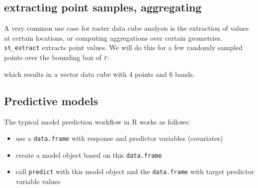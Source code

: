 \documentclass[]{book}
\newenvironment{Shaded}{\begin{snugshade}}{\end{snugshade}}
\newcommand{\CommentTok}[1]{\textcolor[rgb]{0.56,0.35,0.01}{\textit{#1}}}
\newcommand{\DataTypeTok}[1]{\textcolor[rgb]{0.13,0.29,0.53}{#1}}
\newcommand{\DecValTok}[1]{\textcolor[rgb]{0.00,0.00,0.81}{#1}}
\newcommand{\KeywordTok}[1]{\textcolor[rgb]{0.13,0.29,0.53}{\textbf{#1}}}
\newcommand{\NormalTok}[1]{#1}
\newcommand{\OperatorTok}[1]{\textcolor[rgb]{0.81,0.36,0.00}{\textbf{#1}}}
\newcommand{\StringTok}[1]{\textcolor[rgb]{0.31,0.60,0.02}{#1}}
\providecommand{\tightlist}{%
  \setlength{\itemsep}{0pt}\setlength{\parskip}{0pt}}
\begin{document}
\hypertarget{extracting-point-samples-aggregating}{%
\subsection{extracting point samples, aggregating}\label{extracting-point-samples-aggregating}}

A very common use case for raster data cube analysis is the extraction
of values at certain locations, or computing aggregations over certain
geometries. \texttt{st\_extract} extracts point values. We will do this
for a few randomly sampled points over the bounding box of \texttt{r}:

\begin{Shaded}
\end{Shaded}

which results in a vector data cube with 4 points and 6 bands.

\hypertarget{predictive-models}{%
\subsection{Predictive models}\label{predictive-models}}

The typical model prediction workflow in R works as follows:

\begin{itemize}
\tightlist
\item
  use a \texttt{data.frame} with response and predictor variables (covariates)
\item
  create a model object based on this \texttt{data.frame}
\item
  call \texttt{predict} with this model object and the \texttt{data.frame} with target predictor variable values
\end{itemize}
\end{document}

